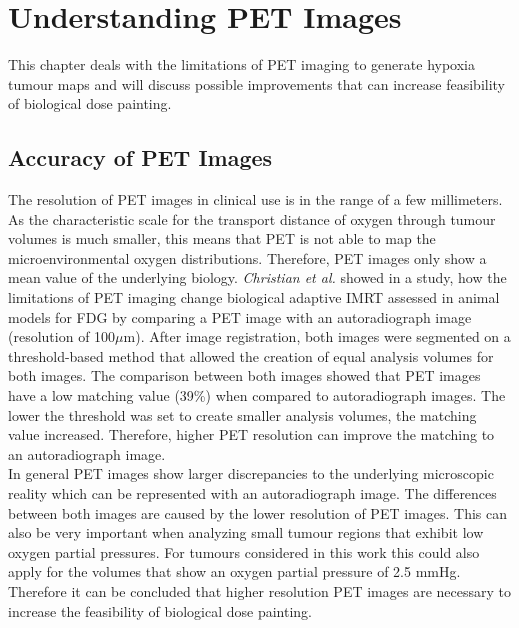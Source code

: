 
\section{Understanding PET Images}
This chapter deals with the limitations of PET imaging to generate hypoxia tumour maps and will discuss possible improvements that can increase feasibility of biological dose painting.
\subsection{Accuracy of PET Images}\label{chap:petaccuracy}
The resolution of PET images in clinical use is in the range of a few millimeters. As the characteristic scale for the transport distance of oxygen through tumour volumes is much smaller, this means that PET is not able to map the microenvironmental oxygen distributions. Therefore, PET images only show a mean value of the underlying biology. \textit{Christian et al.} \cite{pmid19097661, pmid19293465} showed in a study, how the limitations of PET imaging change biological adaptive IMRT assessed in animal models for FDG by comparing a PET image with an autoradiograph image (resolution of 100$\mu$m). After image registration, both images were segmented on a threshold-based method that allowed the creation of equal analysis volumes for both images. The comparison between both images showed that PET images have a low matching value (39\%) when compared to autoradiograph images. The lower the threshold was set to create smaller analysis volumes, the matching value increased. Therefore, higher PET resolution can improve the matching to an autoradiograph image.\\In general PET images show larger discrepancies to the underlying microscopic reality which can be represented with an autoradiograph image. The differences between both images are caused by the lower resolution of PET images. This can also be very important when analyzing small tumour regions that exhibit low oxygen partial pressures. For tumours considered in this work this could also apply for the volumes that show an oxygen partial pressure of 2.5 mmHg. Therefore it can be concluded that higher resolution PET images are necessary to increase the feasibility of biological dose painting.
